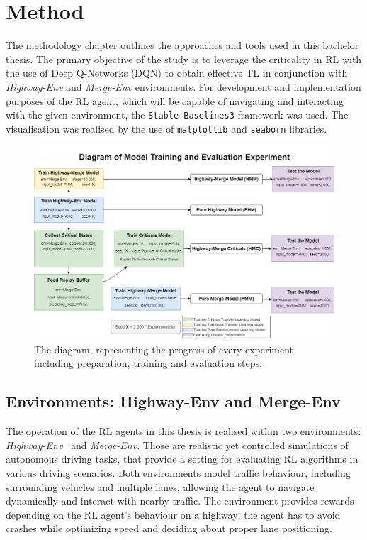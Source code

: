 \section{Method}\label{chap:chap_3}

The methodology chapter outlines the approaches and tools used in this bachelor thesis. The primary objective of the study is to leverage the criticality in RL with the use of Deep Q-Networks (DQN) to obtain effective TL in conjunction with \emph{Highway-Env} and \emph{Merge-Env} environments. For development and implementation purposes of the RL agent, which will be capable of navigating and interacting with the given environment, the \texttt{Stable-Baselines3} framework was used. The visualisation was realised by the use of \texttt{matplotlib} and \texttt{seaborn} libraries.

\begin{figure}[H]
    \centering
    \includegraphics[width=\textwidth]{images/Diagram.png}
    \caption{The diagram, representing the progress of every experiment including preparation, training and evaluation steps.}
    \label{fig:diagram}
\end{figure}

\subsection{Environments: Highway-Env and Merge-Env}\label{sec:environments}

The operation of the RL agents in this thesis is realised within two environments: \emph{Highway-Env}~\cite{highway-env} and \emph{Merge-Env}. Those are realistic yet controlled simulations of autonomous driving tasks, that provide a setting for evaluating RL algorithms in various driving scenarios. Both environments model traffic behaviour, including surrounding vehicles and multiple lanes, allowing the agent to navigate dynamically and interact with nearby traffic. The environment provides rewards depending on the RL agent's behaviour on a highway; the agent has to avoid crashes while optimizing speed and deciding about proper lane positioning.

